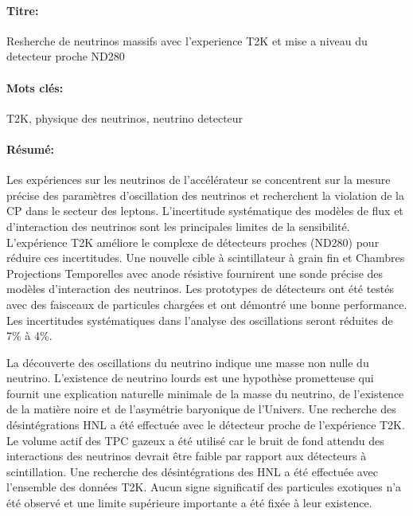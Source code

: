 \documentclass[../main.tex]{subfiles}
\begin{document}
\begin{mdframed}[linecolor=Prune,linewidth=1]
\vspace{-.25cm}
\paragraph*{Titre:} Resherche de neutrinos massifs avec l'experience T2K et mise a niveau du detecteur proche ND280

\begin{small}
\vspace{-.25cm}
\paragraph*{Mots clés:} T2K, physique des neutrinos, neutrino detecteur

\vspace{-.5cm}
\begin{multicols}{2}
\paragraph*{Résumé:} Les expériences sur les neutrinos de l'accélérateur se concentrent sur la mesure précise des paramètres d'oscillation des neutrinos et recherchent la violation de la CP dans le secteur des leptons. L'incertitude systématique des modèles de flux et d'interaction des neutrinos sont les principales limites de la sensibilité. L'expérience T2K améliore le complexe de détecteurs proches (ND280) pour réduire ces incertitudes. Une nouvelle cible à scintillateur à grain fin et Chambres Projections Temporelles avec anode résistive fournirent une sonde précise des modèles d'interaction des neutrinos. Les prototypes de détecteurs ont été testés avec des faisceaux de particules chargées et ont démontré une bonne performance. Les incertitudes systématiques dans l'analyse des oscillations seront réduites de 7\% à 4\%.

La découverte des oscillations du neutrino indique une masse non nulle du neutrino. L'existence de neutrino lourds est une hypothèse prometteuse qui fournit une explication naturelle minimale de la masse du neutrino, de l'existence de la matière noire et de l'asymétrie baryonique de l'Univers. Une recherche des désintégrations HNL a été effectuée avec le détecteur proche de l'expérience T2K. Le volume actif des TPC gazeux a été utilisé car le bruit de fond attendu des interactions des neutrinos devrait être faible par rapport aux détecteurs à scintillation. Une recherche des désintégrations des HNL a été effectuée avec l'ensemble des données T2K. Aucun signe significatif des particules exotiques n'a été observé et une limite supérieure importante a été fixée à leur existence.

\end{multicols}
\end{small}
\end{mdframed}
\end{document}
